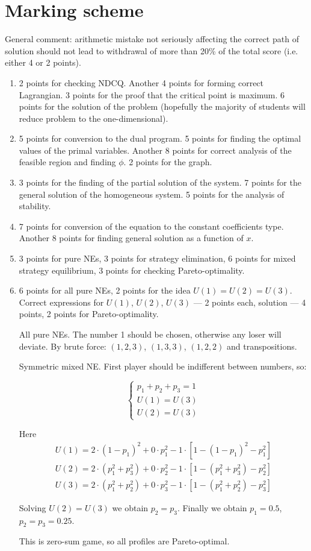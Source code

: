 \documentclass[12pt,a4paper]{article}
\begin{document}
\section{Marking scheme }



General comment: arithmetic mistake not seriously affecting the correct path of solution should not lead to withdrawal of more than 20\% of the total score (i.e. either 4 or 2 points).
\begin{enumerate}

\item 2 points for checking NDCQ. Another 4 points for forming correct Lagrangian. 3 points for the proof that the critical point is maximum. 6 points for the solution of the problem (hopefully the majority of students will reduce problem to the one-dimensional).
\item 5 points for conversion to the dual program. 5 points for finding the optimal values of the primal variables. Another 8 points for correct analysis of the feasible region and finding $\phi$. 2 points for the graph. 
\item 3 points for the finding of the partial solution of the system. 7 points for the general solution of the homogeneous system. 5 points for the analysis of stability.
\item 7 points for conversion of the equation to the constant coefficients type. Another 8 points for finding general solution as a function of $x$.
\item 3 points for pure NEs, 3 points for strategy elimination, 6 points for mixed strategy equilibrium, 3 points for checking Pareto-optimality.
\item 6 points for all pure NEs, 2 points for the idea $U(1)=U(2)=U(3)$. Correct expressions for $U(1)$, $U(2)$, $U(3)$ --- 2 points each, solution --- 4 points, 2 points for Pareto-optimality.

All pure NEs. The number 1 should be chosen, otherwise any loser  will deviate. By brute force: $(1,2,3)$, $(1,3,3)$, $(1,2,2)$ and transpositions.

Symmetric mixed NE. First player should be indifferent between numbers, so:

\[
\begin{cases}
p_1+p_2+p_3=1 \\
U(1)=U(3) \\
U(2)=U(3) 
\end{cases}
\]

Here 
\begin{align*}
U(1)=2\cdot (1-p_1)^2+0\cdot p_1^2-1\cdot [1-(1-p_1)^2-p_1^2] \\
U(2)=2\cdot (p_1^2+p_3^2)+0\cdot p_2^2-1\cdot [1-(p_1^2+p_3^2)-p_2^2] \\
U(3)=2\cdot (p_1^2+p_2^2)+0\cdot p_3^2-1\cdot [1-(p_1^2+p_2^2)-p_3^2]
\end{align*}

Solving $U(2)=U(3)$ we obtain $p_2=p_3$. Finally we obtain $p_1=0.5$, $p_2=p_3=0.25$.

This is zero-sum game, so all profiles are Pareto-optimal.


\end{enumerate}
\end{document}
